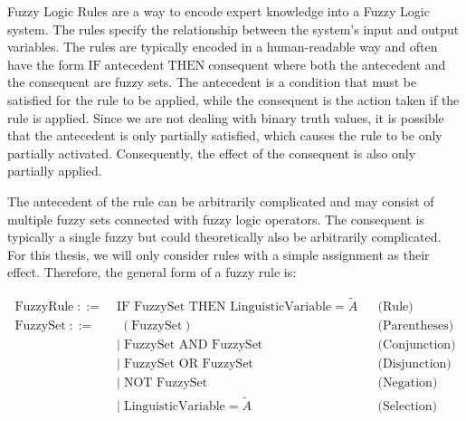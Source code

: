 Fuzzy Logic Rules are a way to encode expert knowledge into a Fuzzy Logic system. The rules specify the relationship between the system's input and output variables.
The rules are typically encoded in a human-readable way and often have the form \emph{$\text{IF} \; \text{antecedent} \; \text{THEN} \; \text{consequent}$} where both the antecedent and the consequent are fuzzy sets. The antecedent is a condition that must be satisfied for the rule to be applied, while the consequent is the action taken if the rule is applied. Since we are not dealing with binary truth values, it is possible that the antecedent is only partially satisfied, which causes the rule to be only partially activated. Consequently, the effect of the consequent is also only partially applied.

\medskip

The antecedent of the rule can be arbitrarily complicated and may consist of multiple fuzzy sets connected with fuzzy logic operators. The consequent is typically a single fuzzy but could theoretically also be arbitrarily complicated. For this thesis, we will only consider rules with a simple assignment as their effect. Therefore, the general form of a fuzzy rule is:

\newcommand{\fuzzyset}{\langle \text{fuzzy set} \rangle}

\newcommand{\fuzzyrule}{\langle \text{rule} \rangle}

\begin{align*}
      \text{FuzzyRule} \;::=\; & \text{IF } \text{FuzzySet } \text{THEN } \text{LinguisticVariable}=\tilde{A} &  & \text{(Rule)}        \\[10pt]
      \text{FuzzySet} \;::=\;  & \; (\text{FuzzySet})                                                         &  & \text{(Parentheses)} \\
                               & | \;\text{FuzzySet } \text{AND } \text{FuzzySet}                             &  & \text{(Conjunction)} \\
                               & | \;\text{FuzzySet } \text{OR } \text{FuzzySet}                              &  & \text{(Disjunction)} \\
                               & | \;\text{NOT } \text{FuzzySet}                                              &  & \text{(Negation)}    \\
                               & | \;\text{LinguisticVariable} = \tilde{A}                                    &  & \text{(Selection)}
\end{align*}

